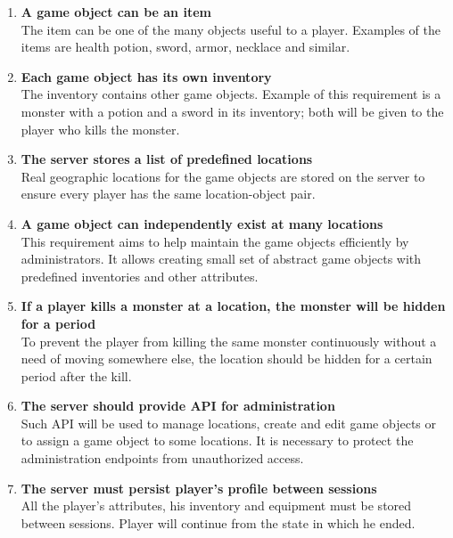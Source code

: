 \begin{enumerate}
			\item \textbf{A game object can be an item} \\	
			The item can be one of the many objects useful to a player. Examples of the items are health potion, sword, armor, necklace and similar.
			
			\item \textbf{Each game object has its own inventory} \\
			The inventory contains other game objects. Example of this requirement is a monster with a potion and a sword in its inventory; both will be given to the player who kills the monster.  
			
			\item \textbf{The server stores a list of predefined locations} \\	
			Real geographic locations for the game objects are stored on the server to ensure every player has the same location-object pair. 
								
			\item \textbf{A game object can independently exist at many locations} \\
			This requirement aims to help maintain the game objects efficiently by administrators. It allows creating small set of abstract game objects with predefined inventories and other attributes. 
			
			\item \textbf{If a player kills a monster at a location, the monster will be hidden for a period} \\
			To prevent the player from killing the same monster continuously without a need of moving somewhere else, the location should be hidden for a certain period after the kill.
			
			\item \textbf{The server should provide API for administration} \\	
			Such API will be used to manage locations, create and edit game objects or to assign a game object to some locations. It is necessary to protect the administration endpoints from unauthorized access.
					
			\item \textbf{The server must persist player’s profile between sessions} \\
			All the player's attributes, his inventory and equipment must be stored between sessions. Player will continue from the state in which he ended.
			
		\end{enumerate}
